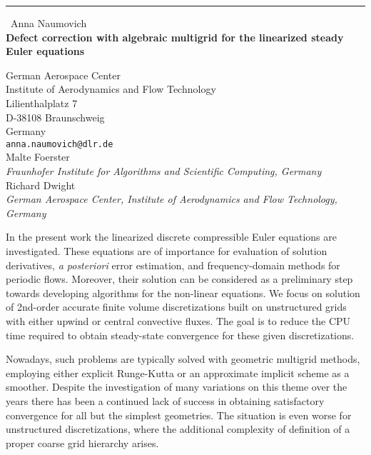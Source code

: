 \documentclass{report}
\begin{document}
\begin{center}
\rule{6in}{1pt} \
{\large Anna Naumovich \\
{\bf Defect correction with algebraic multigrid for the linearized steady Euler equations}}

German Aerospace Center \\ Institute of Aerodynamics and Flow Technology \\ Lilienthalplatz 7 \\ D-38108 Braunschweig \\ Germany
\\
{\tt anna.naumovich@dlr.de}\\
Malte Foerster\\
{\em Fraunhofer Institute for Algorithms and Scientific Computing, %
Germany} \\
Richard Dwight \\
{\em 
German Aerospace Center, Institute of Aerodynamics and Flow Technology, 
Germany
}
\end{center}

In the present work the linearized discrete compressible Euler equations
are investigated.
These equations are of importance for evaluation of solution derivatives,
{\it a posteriori} error estimation, and frequency-domain methods for periodic flows.
Moreover, their solution can be considered as a preliminary step towards developing
algorithms for the non-linear equations. We focus on solution of 2nd-order accurate
finite volume discretizations built on unstructured grids with either upwind or central
convective fluxes. The goal is to reduce the CPU time required to obtain steady-state
convergence for these given discretizations.

Nowadays, such problems are typically solved with geometric multigrid methods,
employing either explicit Runge-Kutta or an approximate implicit scheme as a smoother.
Despite the investigation of many variations on this theme over the years there has
been a continued lack of success in obtaining satisfactory convergence for all but
the simplest geometries. The situation is even worse for unstructured discretizations,
where the additional complexity of definition of a proper coarse grid hierarchy arises.
\end{document}
